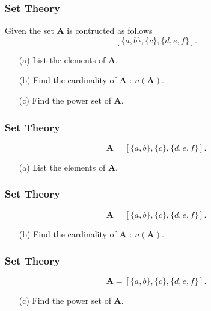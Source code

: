 \documentclass{beamer}
\begin{document}
	\begin{frame}
		\frametitle{Set Theory}
		\Large
		\vspace{-1.8cm}
		Given the set \textbf{A} is contructed as follows 
		\[ [\{a, b\}, \{c\}, \{d, e, f \} ]. \]
		
		\begin{itemize}
			\item[(a)] List the elements of \textbf{A}. 
			\item[(b)] Find the cardinality of \textbf{A} : $n(\boldsymbol{A})$. 
			\item[(c)] Find the power set of \textbf{A}.
		\end{itemize}
		
	\end{frame}
	
	\begin{frame}
		\frametitle{Set Theory}
		\Large
		\vspace{-3.8cm}
		\[\boldsymbol{A} = [\{a, b\}, \{c\},\{d, e, f \}]. \]
		\begin{itemize}
			\item[(a)] List the elements of \textbf{A}. 
		\end{itemize}
		
	\end{frame}
	
	\begin{frame}
		\frametitle{Set Theory}
		\Large
		\vspace{-3.8cm}
		\[\boldsymbol{A} = [\{a, b\}, \{c\},\{d, e, f \}]. \]
		\begin{itemize}
			\item[(b)] Find the cardinality of \textbf{A} : $n(\boldsymbol{A})$. 
		\end{itemize}
		
	\end{frame}
	
	\begin{frame}
		\frametitle{Set Theory}
		\Large
		\vspace{-3.8cm}
		\[\boldsymbol{A} = [\{a, b\}, \{c\},\{d, e, f \}]. \]
		\begin{itemize}
			\item[(c)] Find the power set of \textbf{A}. 
		\end{itemize}
		
	\end{frame}
	
\end{document}
